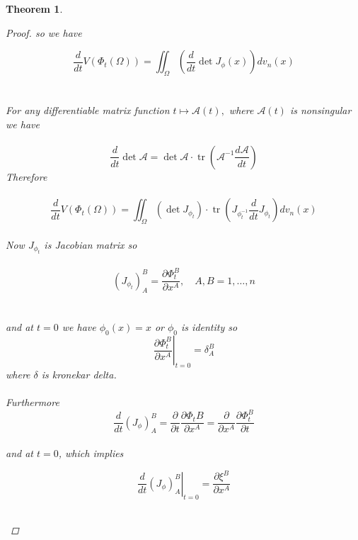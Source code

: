 \documentclass[oneside]{book}
\newtheorem{theorem}{Theorem}[section]
\begin{document}
\begin{theorem}
\begin{proof}
			so we have 
			
			\begin{equation} 
			\label{eq25.5}
			\frac{d}{d t} V\left(\Phi_{t}(\Omega)\right)=\iint_{\Omega}\left(\frac{d}{d t} \operatorname{det} J_{\phi}(x)\right) d v_{n}(x)
			\end{equation}
			\\\\
			For any differentiable
			matrix function $t \mapsto \mathcal{A}(t),$ where $\mathcal{A}(t)$ is nonsingular we have \\\\
			\begin{equation}
			\label{eq26}
			\frac{d}{d t} \operatorname{det} \mathcal{A}=\operatorname{det} \mathcal{A} \cdot \operatorname{tr}\left(\mathcal{A}^{-1} \frac{d \mathcal{A}}{d t}\right)
			\end{equation}
			Therefore \\\\
			$$\frac{d}{d t} V\left(\Phi_{t}(\Omega)\right)=\iint_{\Omega}\left(\operatorname{det} J_{\phi_{t}}\right) \cdot \operatorname{tr}\left(J_{\phi_{t}^{-1}}\frac{d}{d t} J_{\phi_{t}}\right) d v_{n}(x)$$
			\\
			Now  $J_{\phi_{t}}$ is Jacobian matrix so \\\\
			\begin{equation}
			\label{eq27}
			\left(J_{\phi_{t}}\right)_{A}^{B}=\frac{\partial \Phi_{t}^{B}}{\partial x^{A}}, \quad A, B=1, \ldots, n  
			\end{equation} 
			\\\\
			and at $t = 0$ we have $\phi_{0}(x) = x$ or $\phi_{0}$ is identity so 
			\\
			
			$$\left.\frac{\partial \Phi_{t}^{B}}{\partial x^{A}}\right|_{t=0}=\delta_{A}^{B}$$ where $\delta$ is kronekar delta.\\\\ 
			Furthermore \\
			$$\frac{d}{d t}\left(J_{\phi}\right)_{A}^{B}=\frac{\partial}{\partial t} \frac{\partial \Phi_{t} B}{\partial x^{A}}=\frac{\partial}{\partial x^{A}} \frac{\partial \Phi_{t}^{B}}{\partial t}$$ \\
			
			
			and at $t=0$, which implies 
			\begin{center}
				$$\left.\frac{d}{d t}\left(J_{\phi}\right)_{A}^{B}\right|_{t=0}=\frac{\partial \xi^{B}}{\partial x^{A}}$$ \\
			\end{center}
			

\end{proof}
\end{theorem}
\end{document}
